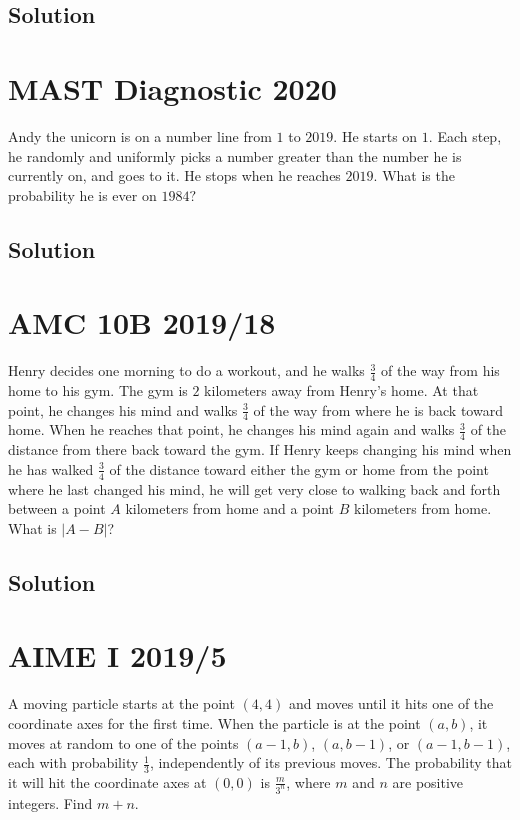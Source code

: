\documentclass{article}
\begin{document}
\subsection{Solution}    




\pagebreak\section{MAST Diagnostic 2020} Andy the unicorn is on a number line from $1$ to $2019.$ He starts on $1.$ Each step, he randomly and uniformly picks a number greater than the number he is currently on, and goes to it. He stops when he reaches $2019.$ What is the probability he is ever on $1984?$
\subsection{Solution}





\pagebreak\section{AMC 10B 2019/18} Henry decides one morning to do a workout, and he walks $\tfrac{3}{4}$ of the way from his home to his gym. The gym is $2$ kilometers away from Henry's home. At that point, he changes his mind and walks $\tfrac{3}{4}$ of the way from where he is back toward home. When he reaches that point, he changes his mind again and walks $\tfrac{3}{4}$ of the distance from there back toward the gym. If Henry keeps changing his mind when he has walked $\tfrac{3}{4}$ of the distance toward either the gym or home from the point where he last changed his mind, he will get very close to walking back and forth between a point $A$ kilometers from home and a point $B$ kilometers from home. What is $|A-B|$?
\subsection{Solution}    




\pagebreak\section{AIME I 2019/5} A moving particle starts at the point $(4,4)$ and moves until it hits one of the coordinate axes for the first time. When the particle is at the point $(a,b)$, it moves at random to one of the points $(a-1,b)$, $(a,b-1)$, or $(a-1,b-1)$, each with probability $\tfrac{1}{3}$, independently of its previous moves. The probability that it will hit the coordinate axes at $(0,0)$ is $\tfrac{m}{3^n}$, where $m$ and $n$ are positive integers. Find $m + n$.
\end{document}
